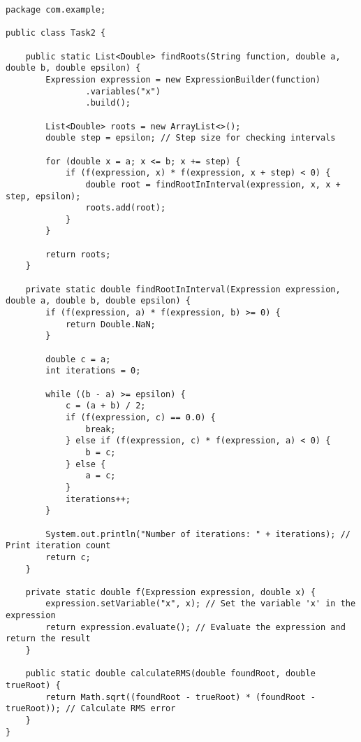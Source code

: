     \begin{lstlisting}[style=JavaStyle, caption={Java Code for Task2}]
package com.example;

public class Task2 {

    public static List<Double> findRoots(String function, double a, double b, double epsilon) {
        Expression expression = new ExpressionBuilder(function)
                .variables("x")
                .build();

        List<Double> roots = new ArrayList<>();
        double step = epsilon; // Step size for checking intervals

        for (double x = a; x <= b; x += step) {
            if (f(expression, x) * f(expression, x + step) < 0) {
                double root = findRootInInterval(expression, x, x + step, epsilon);
                roots.add(root);
            }
        }

        return roots;
    }

    private static double findRootInInterval(Expression expression, double a, double b, double epsilon) {
        if (f(expression, a) * f(expression, b) >= 0) {
            return Double.NaN;
        }

        double c = a;
        int iterations = 0;

        while ((b - a) >= epsilon) {
            c = (a + b) / 2;
            if (f(expression, c) == 0.0) {
                break;
            } else if (f(expression, c) * f(expression, a) < 0) {
                b = c;
            } else {
                a = c;
            }
            iterations++;
        }

        System.out.println("Number of iterations: " + iterations); // Print iteration count
        return c;
    }

    private static double f(Expression expression, double x) {
        expression.setVariable("x", x); // Set the variable 'x' in the expression
        return expression.evaluate(); // Evaluate the expression and return the result
    }

    public static double calculateRMS(double foundRoot, double trueRoot) {
        return Math.sqrt((foundRoot - trueRoot) * (foundRoot - trueRoot)); // Calculate RMS error
    }
}

    \end{lstlisting}

